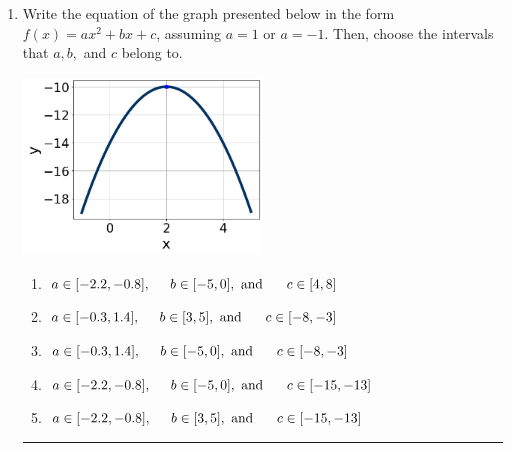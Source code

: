 \documentclass[14pt]{extbook}
\newcommand{\litem}[1]{\item#1\hspace*{-1cm}\rule{\textwidth}{0.4pt}}
\begin{document}
\begin{enumerate}
{\begin{enumerate}[label=\Alph*.]
\end{enumerate} }
\litem{
Write the equation of the graph presented below in the form $f(x)=ax^2+bx+c$, assuming  $a=1$ or $a=-1$. Then, choose the intervals that $a, b,$ and $c$ belong to.
\begin{center}
    \includegraphics[width=0.5\textwidth]{../Figures/quadraticGraphToEquationB.png}
\end{center}
\begin{enumerate}[label=\Alph*.]
\item \( a \in [-2.2, -0.8], \hspace*{5mm} b \in [-5, 0], \text{ and } \hspace*{5mm} c \in [4, 8] \)
\item \( a \in [-0.3, 1.4], \hspace*{5mm} b \in [3, 5], \text{ and } \hspace*{5mm} c \in [-8, -3] \)
\item \( a \in [-0.3, 1.4], \hspace*{5mm} b \in [-5, 0], \text{ and } \hspace*{5mm} c \in [-8, -3] \)
\item \( a \in [-2.2, -0.8], \hspace*{5mm} b \in [-5, 0], \text{ and } \hspace*{5mm} c \in [-15, -13] \)
\item \( a \in [-2.2, -0.8], \hspace*{5mm} b \in [3, 5], \text{ and } \hspace*{5mm} c \in [-15, -13] \)


\end{enumerate}}
\end{enumerate}
\end{document}
